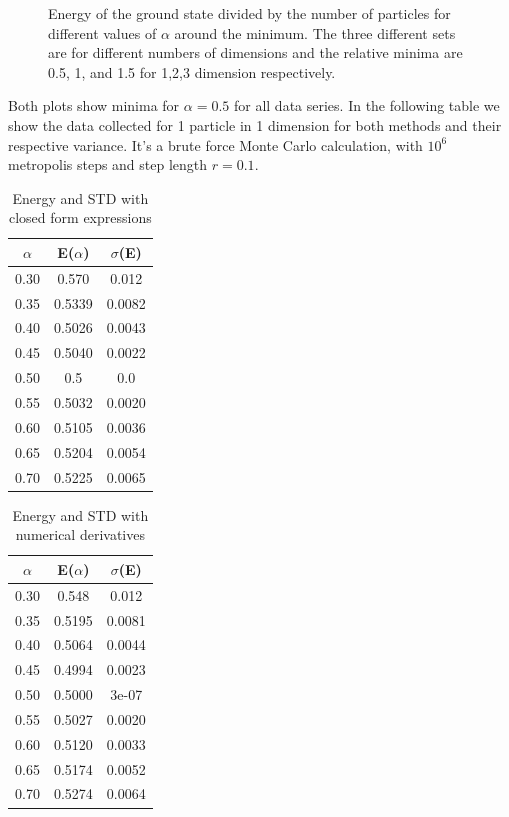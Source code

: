 \documentclass[10pt,a4paper,titlepage]{article}
\begin{document}
\begin{center}
\begin{figure}[H]
\caption{{\footnotesize Energy of the ground state divided by the number of particles for different values of $\alpha$ around the minimum. The three different sets are for different numbers of dimensions and the relative minima are 0.5, 1, and 1.5 for 1,2,3 dimension respectively. }}
\label{fig:fig}
\end{figure}
\end{center}

Both plots show minima for $\alpha = 0.5$ for all data series. In the following table we show the data collected for 1 particle in 1 dimension for both methods and their respective variance. It's a brute force Monte Carlo calculation, with $10^6$ metropolis steps and step length $r=0.1$.\\

\begin{minipage}[b]{0.5\textwidth}\centering
\begin{table}[H]
\caption{{\footnotesize Energy and STD with closed form expressions }}
\begin{center}

\begin{tabular}[t]{c c c}
\hline
$\alpha$ & E($\alpha$) & $\sigma $(E) \\\hline 
0.30& 0.570 & 0.012 \\
0.35& 0.5339& 0.0082 \\
0.40& 0.5026& 0.0043 \\
0.45& 0.5040& 0.0022 \\
0.50& 0.5   & 0.0 \\
0.55& 0.5032& 0.0020\\ 
0.60& 0.5105& 0.0036 \\
0.65& 0.5204& 0.0054 \\
0.70& 0.5225& 0.0065 \\
\hline
\end{tabular}
\end{center}
\end{table}
\end{minipage}
\begin{minipage}[b]{0.5\linewidth}\centering
\begin{table}[H]
\caption{{\footnotesize Energy and STD with numerical derivatives }}
\begin{center}
\begin{tabular}[t]{c c c}
\hline
$\alpha$ & E($\alpha$) & $\sigma $(E) \\\hline
0.30& 0.548& 0.012 \\
0.35& 0.5195& 0.0081 \\
0.40& 0.5064& 0.0044 \\
0.45& 0.4994& 0.0023 \\
0.50& 0.5000& 3e-07 \\
0.55& 0.5027& 0.0020 \\
0.60& 0.5120& 0.0033 \\
0.65& 0.5174& 0.0052 \\
0.70& 0.5274& 0.0064 \\
\hline
\end{tabular}
\end{center}
\end{table}
\end{minipage}
\end{document}
